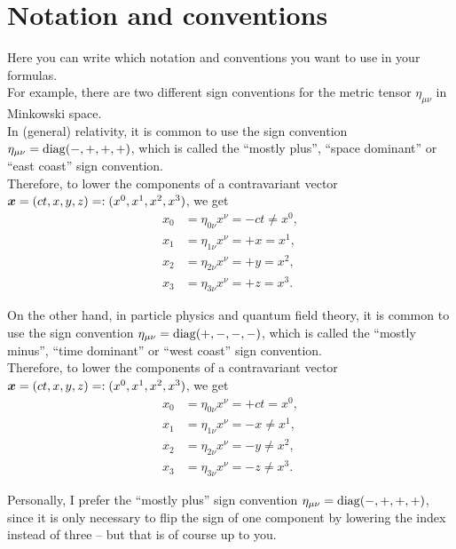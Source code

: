 \chapter*{Notation and conventions}

Here you can write which notation and conventions you want to use in your formulas. \\

\noindent For example, there are two different sign conventions for the metric tensor $\eta_{\mu \nu}$ in Minkowski space. \\

\noindent In (general) relativity, it is common to use the sign convention $\eta_{\mu \nu} = \operatorname{diag}(-,+,+,+)$, which is called the ``mostly plus'', ``space dominant'' or ``east coast'' sign convention. \\
Therefore, to lower the components of a contravariant vector $\boldsymbol{x} = (ct, x, y, z) =: (x^{0}, x^{1}, x^{2}, x^{3})$, we get
\begin{align*}
    x_{0} &= \eta_{0 \nu} x^{\nu} = - ct \neq x^{0}, \\
    x_{1} &= \eta_{1 \nu} x^{\nu} = +x = x^{1}, \\ 
    x_{2} &= \eta_{2 \nu} x^{\nu} = +y = x^{2}, \\
    x_{3} &= \eta_{3 \nu} x^{\nu} = +z = x^{3}.
\end{align*}


\noindent On the other hand, in particle physics and quantum field theory, it is common to use the sign convention $\eta_{\mu \nu} = \operatorname{diag}(+,-,-,-)$, which is called the ``mostly minus'', ``time dominant'' or ``west coast'' sign convention. \\
Therefore, to lower the components of a contravariant vector $\boldsymbol{x} = (ct, x, y, z) =: (x^{0}, x^{1}, x^{2}, x^{3})$, we get
\begin{align*}
    x_{0} &= \eta_{0 \nu} x^{\nu} = +ct = x^{0}, \\
    x_{1} &= \eta_{1 \nu} x^{\nu} = -x \neq x^{1}, \\ 
    x_{2} &= \eta_{2 \nu} x^{\nu} = -y \neq x^{2}, \\
    x_{3} &= \eta_{3 \nu} x^{\nu} = -z \neq x^{3}.
\end{align*}

\noindent Personally, I prefer the ``mostly plus'' sign convention $\eta_{\mu \nu} = \operatorname{diag}(-,+,+,+)$, since it is only necessary to flip the sign of one component by lowering the index instead of three -- but that is of course up to you. \\

